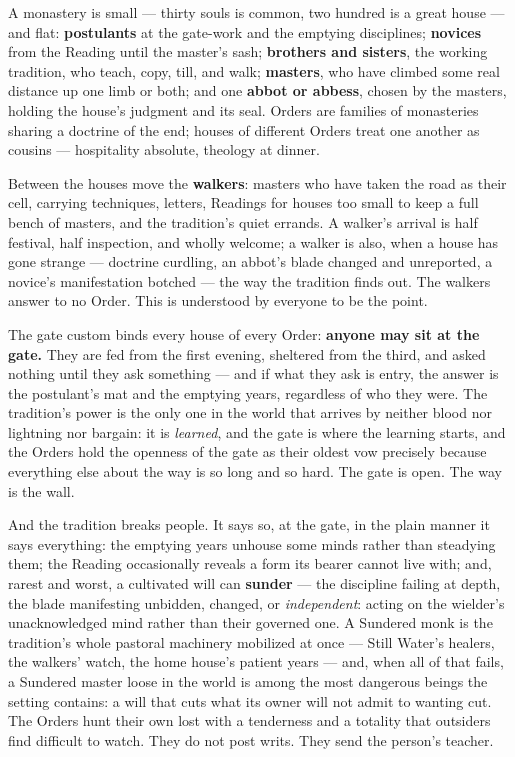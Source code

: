 A monastery is small --- thirty souls is common, two hundred is a great house --- and flat: \textbf{postulants} at the gate-work and the emptying disciplines; \textbf{novices} from the Reading until the master's sash; \textbf{brothers and sisters}, the working tradition, who teach, copy, till, and walk; \textbf{masters}, who have climbed some real distance up one limb or both; and one \textbf{abbot or abbess}, chosen by the masters, holding the house's judgment and its seal. Orders are families of monasteries sharing a doctrine of the end; houses of different Orders treat one another as cousins --- hospitality absolute, theology at dinner.

Between the houses move the \textbf{walkers}: masters who have taken the road as their cell, carrying techniques, letters, Readings for houses too small to keep a full bench of masters, and the tradition's quiet errands. A walker's arrival is half festival, half inspection, and wholly welcome; a walker is also, when a house has gone strange --- doctrine curdling, an abbot's blade changed and unreported, a novice's manifestation botched --- the way the tradition finds out. The walkers answer to no Order. This is understood by everyone to be the point.

The gate custom binds every house of every Order: \textbf{anyone may sit at the gate.} They are fed from the first evening, sheltered from the third, and asked nothing until they ask something --- and if what they ask is entry, the answer is the postulant's mat and the emptying years, regardless of who they were. The tradition's power is the only one in the world that arrives by neither blood nor lightning nor bargain: it is \textit{learned}, and the gate is where the learning starts, and the Orders hold the openness of the gate as their oldest vow precisely because everything else about the way is so long and so hard. The gate is open. The way is the wall.

And the tradition breaks people. It says so, at the gate, in the plain manner it says everything: the emptying years unhouse some minds rather than steadying them; the Reading occasionally reveals a form its bearer cannot live with; and, rarest and worst, a cultivated will can \textbf{sunder} --- the discipline failing at depth, the blade manifesting unbidden, changed, or \textit{independent}: acting on the wielder's unacknowledged mind rather than their governed one. A Sundered monk is the tradition's whole pastoral machinery mobilized at once --- Still Water's healers, the walkers' watch, the home house's patient years --- and, when all of that fails, a Sundered master loose in the world is among the most dangerous beings the setting contains: a will that cuts what its owner will not admit to wanting cut. The Orders hunt their own lost with a tenderness and a totality that outsiders find difficult to watch. They do not post writs. They send the person's teacher.

